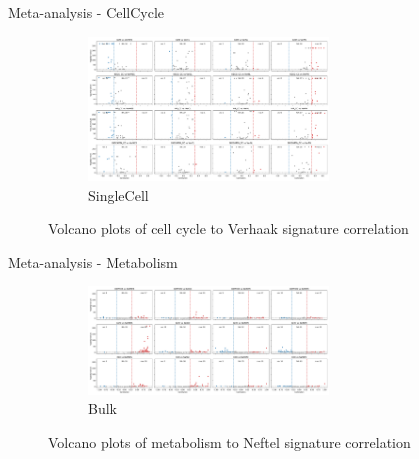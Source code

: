 \documentclass[aspectratio=169,9pt]{beamer}
\begin{document}
    \begin{frame}{Meta-analysis - CellCycle}
        \begin{adjustwidth}{-5cm}{-5cm}
            \centering
            \begin{figure}\ContinuedFloat
                \centering
                \begin{subfigure}[c]{\textwidth}
                    \centering
                    \includegraphics[width=0.7\textwidth]{volcano_SC_Ver_CC}
                    \caption{SingleCell}
                \end{subfigure}
                \caption{Volcano plots of cell cycle to Verhaak signature correlation}
            \end{figure}
        \end{adjustwidth}
    \end{frame}

    \begin{frame}{Meta-analysis - Metabolism}
        \begin{adjustwidth}{-5cm}{-5cm}
            \centering
            \begin{figure}
                \centering
                \begin{subfigure}[c]{\textwidth}
                    \centering
                    \includegraphics[width=0.7\textwidth]{volcano_Bulk_Nef_Met}
                    \caption{Bulk}
                \end{subfigure}
                \caption{Volcano plots of metabolism to Neftel signature correlation}
            \end{figure}
        \end{adjustwidth}
    \end{frame}
\end{document}
